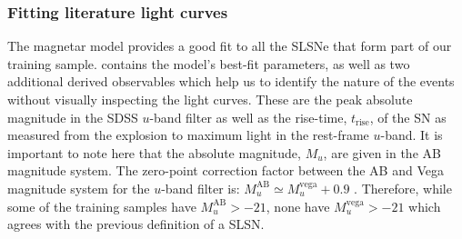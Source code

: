 \subsubsection{Fitting literature light curves}
The magnetar model provides a good fit to all the SLSNe that form part of our training sample.  contains the model's best-fit parameters, as well as two additional derived observables which help us to identify the nature of the events without visually inspecting the light curves. These are the peak absolute magnitude in the SDSS $u$-band filter as well as the rise-time, $t_\mathrm{rise}$, of the SN as measured from the explosion to maximum light in the rest-frame $u$-band. It is important to note here that the absolute magnitude, $M_u$, are given in the AB magnitude system. The zero-point correction factor between the AB and Vega magnitude system for the $u$-band filter is: $M_u^{\mathrm{AB}}\simeq M_u^{\mathrm{vega}}+0.9$ \citep{Blanton2007}. Therefore, while some of the training samples have $M_u^{\mathrm{AB}}>-21$, none have $M_u^{\mathrm{vega}}>-21$ which agrees with the previous definition of a SLSN.

